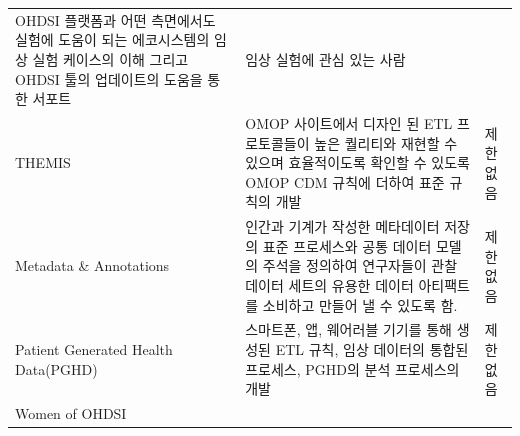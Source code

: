 \documentclass[11pt]{book}
\theoremstyle{definition}
\theoremstyle{definition}
\theoremstyle{definition}
\theoremstyle{remark}
\begin{document}
\begin{longtable}[]{@{}lll@{}}
\begin{minipage}[t]{0.46\columnwidth}
OHDSI 플랫폼과 어떤 측면에서도 실험에 도움이 되는 에코시스템의 임상 실험
케이스의 이해 그리고 OHDSI 툴의 업데이트의 도움을 통한 서포트\strut
\end{minipage} & \begin{minipage}[t]{0.37\columnwidth}\raggedright\strut
임상 실험에 관심 있는 사람\strut
\end{minipage}\tabularnewline
\begin{minipage}[t]{0.09\columnwidth}\raggedright\strut
THEMIS\strut
\end{minipage} & \begin{minipage}[t]{0.46\columnwidth}\raggedright\strut
OMOP 사이트에서 디자인 된 ETL 프로토콜들이 높은 퀄리티와 재현할 수
있으며 효율적이도록 확인할 수 있도록 OMOP CDM 규칙에 더하여 표준 규칙의
개발\strut
\end{minipage} & \begin{minipage}[t]{0.37\columnwidth}\raggedright\strut
제한 없음\strut
\end{minipage}\tabularnewline
\begin{minipage}[t]{0.09\columnwidth}\raggedright\strut
Metadata \& Annotations\strut
\end{minipage} & \begin{minipage}[t]{0.46\columnwidth}\raggedright\strut
인간과 기계가 작성한 메타데이터 저장의 표준 프로세스와 공통 데이터
모델의 주석을 정의하여 연구자들이 관찰 데이터 세트의 유용한 데이터
아티팩트를 소비하고 만들어 낼 수 있도록 함.\strut
\end{minipage} & \begin{minipage}[t]{0.37\columnwidth}\raggedright\strut
제한 없음\strut
\end{minipage}\tabularnewline
\begin{minipage}[t]{0.09\columnwidth}\raggedright\strut
Patient Generated Health Data(PGHD)\strut
\end{minipage} & \begin{minipage}[t]{0.46\columnwidth}\raggedright\strut
스마트폰, 앱, 웨어러블 기기를 통해 생성된 ETL 규칙, 임상 데이터의 통합된
프로세스, PGHD의 분석 프로세스의 개발\strut
\end{minipage} & \begin{minipage}[t]{0.37\columnwidth}\raggedright\strut
제한 없음\strut
\end{minipage}\tabularnewline
\begin{minipage}[t]{0.09\columnwidth}\raggedright\strut
Women of OHDSI\strut
\end{minipage} & \begin{minipage}[t]{0.46\columnwidth}\raggedright\strut

\end{minipage}
\end{longtable}
\end{document}
